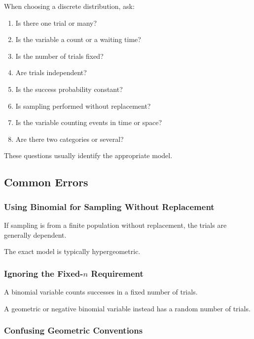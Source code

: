 When choosing a discrete distribution, ask:

\begin{enumerate}
    \item Is there one trial or many?
    \item Is the variable a count or a waiting time?
    \item Is the number of trials fixed?
    \item Are trials independent?
    \item Is the success probability constant?
    \item Is sampling performed without replacement?
    \item Is the variable counting events in time or space?
    \item Are there two categories or several?
\end{enumerate}

These questions usually identify the appropriate model.

\subsection{Common Errors}
\label{subsec:discrete-distributions-common-errors}

\subsubsection{Using Binomial for Sampling Without Replacement}

If sampling is from a finite population without replacement, the trials
are generally dependent.

The exact model is typically hypergeometric.

\subsubsection{Ignoring the Fixed-\(n\) Requirement}

A binomial variable counts successes in a fixed number of trials.

A geometric or negative binomial variable instead has a random number
of trials.

\subsubsection{Confusing Geometric Conventions}


